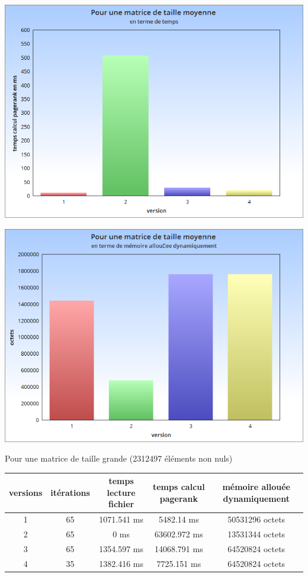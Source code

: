 \documentclass[10pt,a4paper]{article}
\begin{document}
\begin{center}
\includegraphics[scale=0.4]{../histogrammes/matrice_moyenne_temps.png}
\end{center}
\begin{center}
\includegraphics[scale=0.4]{../histogrammes/matrice_moyenne_memoire.png}
\end{center}

\newpage
\begin{center}
Pour une matrice de taille grande (2312497 éléments non nuls)
\end{center}
\begin{tabular}{| c | c | c | c | c |}
\hline
versions & itérations & temps lecture fichier & temps calcul pagerank & mémoire allouée dynamiquement \\
\hline
1 & 65 & 1071.541 ms & 5482.14 ms & 50531296 octets \\
2 & 65 & 0 ms & 63602.972 ms & 13531344 octets\\
3 & 65 & 1354.597 ms & 14068.791 ms & 64520824 octets\\
4 & 35 & 1382.416 ms & 7725.151 ms &  64520824 octets\\
\hline	
\end{tabular}
\end{document}
